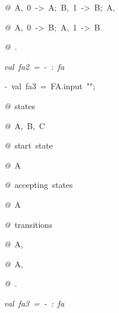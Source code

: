 \begin{list}{}
\item[]\textsl{@\ }A,\ 0\ ->\ A;\ B,\ 1\ ->\ B;\ A,\ %
\item[]\textsl{@\ }A,\ 0\ ->\ B;\ A,\ 1\ ->\ B
\item[]\textsl{@\ }.
\item[]\textsl{val\ fa2\ =\ -\ :\ fa}
\item[]\textsl{-\ }val\ fa3\ =\ FA.input\ "";
\item[]\textsl{@\ }states
\item[]\textsl{@\ }A,\ B,\ C
\item[]\textsl{@\ }start\ state
\item[]\textsl{@\ }A
\item[]\textsl{@\ }accepting\ states
\item[]\textsl{@\ }A
\item[]\textsl{@\ }transitions
\item[]\textsl{@\ }A,\ %
\item[]\textsl{@\ }A,\ %
\item[]\textsl{@\ }.
\item[]\textsl{val\ fa3\ =\ -\ :\ fa}
\end{list}
